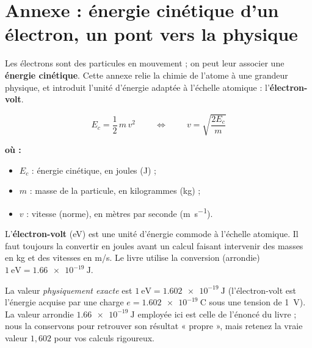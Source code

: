 \documentclass[11pt,a4paper]{article}
\newenvironment{ou}{%
  \par\smallskip\noindent\textbf{où :}\nopagebreak
  \begin{itemize}[leftmargin=1.8em,topsep=2pt,itemsep=1.5pt,parsep=0pt]}%
  {\end{itemize}}
\begin{document}
\section{Annexe : énergie cinétique d'un électron, un pont vers la physique}
Les électrons sont des particules en mouvement ; on peut leur associer une \textbf{énergie cinétique}.
Cette annexe relie la chimie de l'atome à une grandeur physique, et introduit l'unité d'énergie
adaptée à l'échelle atomique : l'\textbf{électron-volt}.

\begin{formule}
\[ \boxed{\ E_c = \dfrac{1}{2}\,m\,v^2\ } \qquad\Longleftrightarrow\qquad \boxed{\ v = \sqrt{\dfrac{2E_c}{m}}\ } \]
\begin{ou}
  \item $E_c$ : énergie cinétique, en joules (\si{\joule}) ;
  \item $m$ : masse de la particule, en kilogrammes (\si{\kilo\gram}) ;
  \item $v$ : vitesse (norme), en mètres par seconde (\si{\metre\per\second}).
\end{ou}
\end{formule}

\begin{definition}
L'\textbf{électron-volt} (\si{\electronvolt}) est une unité d'énergie commode à l'échelle atomique. Il
faut toujours la convertir en joules avant un calcul faisant intervenir des masses en kg et des
vitesses en m/s. Le livre utilise la conversion (arrondie) $\SI{1}{\electronvolt} = \SI{1,66e-19}{\joule}$.
\end{definition}

\begin{attention}
La valeur \emph{physiquement exacte} est $\SI{1}{\electronvolt} = \SI{1,602e-19}{\joule}$ (l'électron-volt
est l'énergie acquise par une charge $e = \SI{1,602e-19}{\coulomb}$ sous une tension de \SI{1}{\volt}).
La valeur arrondie $\SI{1,66e-19}{\joule}$ employée ici est celle de l'énoncé du livre ; nous la
conservons pour retrouver son résultat « propre », mais retenez la vraie valeur $1{,}602$ pour vos
calculs rigoureux.
\end{attention}
\end{document}
